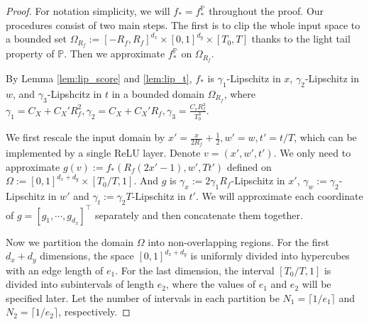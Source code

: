 \documentclass{article}
\numberwithin{equation}{section}
\theoremstyle{definition}
\renewcommand{\P}{\mathbb{P}}
\begin{document}
\begin{proof}
    For notation simplicity, we will $f_*=f_*^\P$ throughout the proof.
    Our procedures consist of two main steps.
    The first is to clip the whole input space to a bounded set $\Omega_{R_f}:=[-R_f,R_f]^{d_x}\times[0,1]^{d_y}\times[T_0,T]$ thanks to the light tail property of $\P$. Then we approximate $f_*^\P$ on $\Omega_{R_f}$.
    
    By Lemma \ref{lem:lip_score} and \ref{lem:lip_t}, $f_*$ is $\gamma_1$-Lipschitz in $x$, $\gamma_2$-Lipschitz in $w$, and $\gamma_3$-Lipshcitz in $t$ in a bounded domain $\Omega_{R_f}$, where $\gamma_1=C_X+C_X'R_f^2,\gamma_2=C_X+C_X'R_f,\gamma_3=\frac{C_sR_f^3}{T_0^3}$.
    
    We first rescale the input domain by $x'=\frac{x}{2R_f}+\frac{1}{2}, w'=w,t'=t/T$, which can be implemented by a single ReLU layer.
    Denote $v=(x',w',t')$. We only need to approximate $g(v):=f_*(R_f(2x'-1), w', Tt')$ defined on $\Omega:=[0,1]^{d_x+d_y}\times[T_0/T,1]$.
    And $g$ is $\gamma_x:=2\gamma_1 R_f$-Lipschitz in $x'$, $\gamma_w:=\gamma_2$-Lipschitz in $w'$ and $\gamma_t:=\gamma_2 T$-Lipschitz in $t'$.
    We will approximate each coordinate of $g=[g_{1}, \cdots,g_{d_x}]^\top$ separately and then concatenate them together.

    Now we partition the domain $\Omega$ into non-overlapping regions. For the first $d_x + d_y$ dimensions, the space $[0, 1]^{d_x + d_y}$ is uniformly divided into hypercubes with an edge length of $e_1$. For the last dimension, the interval $[T_0/T, 1]$ is divided into subintervals of length $e_2$, where the values of $e_1$ and $e_2$ will be specified later. Let the number of intervals in each partition be $N_1 = \lceil 1 / e_1 \rceil$ and $N_2 = \lceil 1 / e_2 \rceil$, respectively.


\end{proof}
\end{document}
